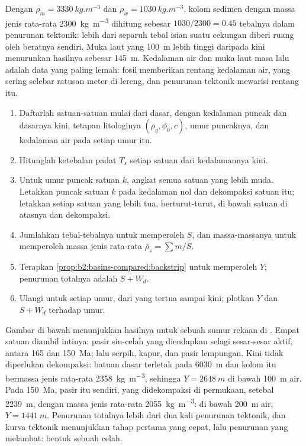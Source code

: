 Dengan $\rho_m = \qty{3330}{kg.m^{-3}}$ dan $\rho_w = \qty{1030}{kg.m^{-3}}$, kolom sedimen dengan
massa jenis rata-rata \qty{2300}{kg.m^{-3}} dihitung sebesar $1030/2300 = 0.45$ tebalnya dalam penurunan
tektonik: lebih dari separuh tebal isian suatu cekungan diberi ruang oleh beratnya sendiri.
Muka laut yang \qty{100}{m} lebih tinggi daripada kini menurunkan hasilnya sebesar \qty{145}{m}. Kedalaman air dan
muka laut masa lalu adalah data yang paling lemah: fosil memberikan rentang kedalaman air, yang sering selebar ratusan
meter di lereng, dan penurunan tektonik mewarisi rentang itu.

\begin{method}\label{met:b2:basins-compared:backstrip}
\begin{enumerate}
  \item Daftarlah satuan-satuan mulai dari dasar, dengan kedalaman puncak dan dasarnya kini,
        tetapan litologinya $(\rho_g, \phi_0, c)$, umur puncaknya, dan kedalaman air pada
        setiap umur itu.
  \item Hitunglah ketebalan padat $T_s$ setiap satuan dari kedalamannya kini.
  \item Untuk umur puncak satuan $k$, angkat semua satuan yang lebih muda. Letakkan puncak satuan
        $k$ pada kedalaman nol dan dekompaksi satuan itu; letakkan setiap satuan yang lebih tua, berturut-turut, di bawah satuan di atasnya
        dan dekompaksi.
  \item Jumlahkan tebal-tebalnya untuk memperoleh $S$, dan massa-massanya untuk memperoleh massa jenis rata-rata
        $\bar\rho_s = \sum m / S$.
  \item Terapkan \cref{prop:b2:basins-compared:backstrip} untuk memperoleh $Y$; penurunan totalnya adalah
        $S + W_d$.
  \item Ulangi untuk setiap umur, dari yang tertua sampai kini; plotkan $Y$ dan $S + W_d$ terhadap umur.
\end{enumerate}
\end{method}

Gambar di bawah menunjukkan hasilnya untuk sebuah sumur rekaan di . Empat satuan diambil intinya:
pasir sin-celah yang diendapkan selagi sesar-sesar aktif, antara 165 dan \qty{150}{Ma}; lalu serpih,
kapur, dan pasir lempungan. Kini tidak diperlukan dekompaksi: batuan dasar terletak pada \qty{6030}{m}
dan kolom itu bermassa jenis rata-rata \qty{2358}{kg.m^{-3}}, sehingga $Y = \qty{2648}{m}$ di bawah
\qty{100}{m} air. Pada \qty{150}{Ma}, pasir itu sendiri, yang didekompaksi di permukaan, setebal
\qty{2239}{m}, dengan massa jenis rata-rata \qty{2055}{kg.m^{-3}}: di bawah \qty{200}{m} air,
$Y = \qty{1441}{m}$. Penurunan totalnya
lebih dari dua kali penurunan tektonik, dan kurva tektonik menunjukkan tahap pertama yang cepat, lalu
penurunan yang melambat: bentuk sebuah celah.

